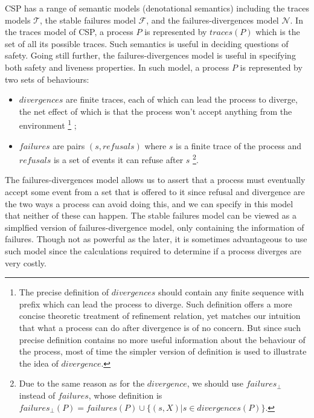 \documentclass{llncs}
\newcommand{\csptracesmodel}{\mathcal{T}}
\newcommand{\cspfdrmodel}{\mathcal{N}}
\newcommand{\cspfailuresmodel}{\mathcal{F}}
\begin{document}
CSP has a range of semantic models (denotational semantics) including the traces models
$\csptracesmodel$, the stable failures model $\cspfailuresmodel$, and the
failures-divergences model $\cspfdrmodel$. In the traces model of CSP, a process
$P$ is represented by $traces(P)$ which is the set of all its possible traces. 
Such semantics is useful in deciding questions of safety. Going still further, the 
failures-divergences model is useful in specifying both safety and liveness
properties. In such model, a process $P$ is represented by two sets of
behaviours:
\begin{itemize}

\item $divergences$ are finite traces, each of which can lead the process to
diverge, the net effect of which is that the process won't accept anything
from the environment
\footnote{The precise definition of $divergences$ should contain any finite
sequence with prefix which can lead the process to diverge.
Such definition offers a more concise theoretic treatment of refinement
relation, yet matches our intuition that what a process can do after divergence
is of no concern. But since such precise definition contains no more useful
information about the behaviour of the process, most of time the simpler version
of definition is used to illustrate the idea of $divergence$.
}
;

\item $failures$ are pairs $(s, refusals)$ where $s$ is a finite trace of the
process and $refusals$ is a set of events it can refuse after $s$
\footnote{Due to the same reason as for the $divergence$,
we should use $failures_{\bot}$ instead of $failures$, whose definition
is $failures_{\bot}(P) = failures(P) \cup \{(s, X)| s \in divergences(P)\}$. 
}.
\end{itemize}
The failures-divergences model allows us to assert that a process must eventually accept
some event from a set that is offered to it since refusal and divergence are the
two ways a process can avoid doing this, and we can specify in this model that
neither of these can happen. The stable failures model can be viewed as a simplfied version of
failures-divergence model, only containing the information of failures. Though
not as powerful as the later, it is sometimes advantageous to use such model
since the calculations required to determine if a process diverges are very
costly.
\end{document}
